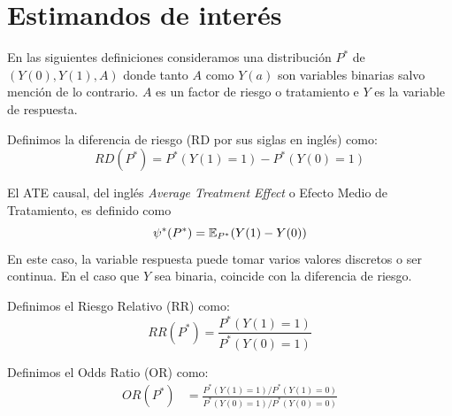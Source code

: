 \section{Estimandos de interés} \label{sec:estimandos_de_interes}
En las siguientes definiciones consideramos una distribución $P^*$ de $(Y(0), Y(1), A)$
donde tanto $A$ como $Y(a)$ son variables binarias salvo mención de lo contrario.
$A$ es un factor de riesgo
o tratamiento
e $Y$ es la variable de respuesta.

\begin{definicion} \label{def:riskdiff} \cite[capítulo 1.3]{whatif}
    Definimos la diferencia de riesgo (RD por sus siglas en inglés) como:
    \[
        RD(P^*) = P^*(Y(1) = 1) - P^*(Y(0) = 1)
    \]
\end{definicion}

\begin{definicion}\cite[sección 2.1]{mci}\label{def:causalATE}
    El ATE causal, del inglés \textit{Average Treatment Effect} o Efecto Medio de Tratamiento,
    es definido como
    \[ \psi^*(P^*) = \mathbb{E}_{P^*}(Y(1) - Y(0)) \]
    En este caso, la variable respuesta puede tomar varios valores discretos o ser continua.
    En el caso que $Y$ sea binaria, coincide con la diferencia de riesgo.
\end{definicion}

\begin{definicion} \label{def:relrisk} %
    Definimos el Riesgo Relativo (RR) como:
    \[
        RR(P^*) = \frac{P^*(Y(1) = 1)}{P^*(Y(0) = 1)}
    \]
\end{definicion}

\begin{definicion} \label{def:oddsratio} %
    Definimos el Odds Ratio (OR) como:
    \begin{align*}
        OR(P^*) & = \frac{P^*(Y(1) = 1)/P^*(Y(1) = 0)}{P^*(Y(0) = 1)/P^*(Y(0) = 0)}
    \end{align*}
\end{definicion}

